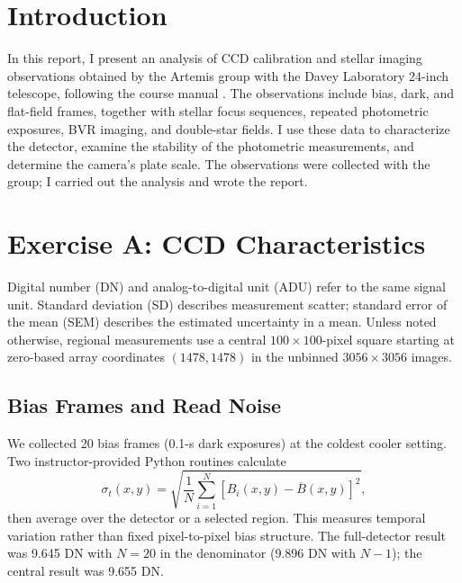\documentclass[12pt,letterpaper,twocolumn]{article}
\begin{document}
\section*{Introduction}
In this report, I present an analysis of CCD calibration and stellar
imaging observations obtained by the Artemis group with the Davey
Laboratory 24-inch telescope, following the course manual \cite{manual}.
The observations include bias, dark, and flat-field frames, together with
stellar focus sequences, repeated photometric exposures, BVR imaging,
and double-star fields. I use these data to characterize the detector,
examine the stability of the photometric measurements, and determine
the camera's plate scale. The observations were collected with the group;
I carried out the analysis and wrote the report.

\section{Exercise A: CCD Characteristics}
Digital number (DN) and analog-to-digital unit (ADU) refer to the same signal unit. Standard deviation (SD) describes measurement scatter; standard error of the mean (SEM) describes the estimated uncertainty in a mean. Unless noted otherwise,
regional measurements use a central $100\times100$-pixel square
starting at zero-based array coordinates $(1478,1478)$ in the
unbinned $3056\times3056$ images.

\subsection{Bias Frames and Read Noise}
We collected 20 bias frames (0.1-s dark exposures) at the coldest
cooler setting. Two instructor-provided Python routines calculate
\begin{equation}
\sigma_t(x,y)=\sqrt{\frac{1}{N}\sum_{i=1}^{N}
[B_i(x,y)-\overline B(x,y)]^2},
\end{equation}
then average over the detector or a selected region. This measures
temporal variation rather than fixed pixel-to-pixel bias structure.
The full-detector result was 9.645 DN with $N=20$ in the denominator
(9.896 DN with $N-1$); the central result was 9.655 DN.
\end{document}
